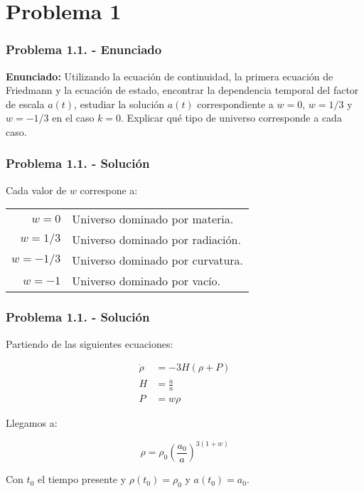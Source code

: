 \section{Problema 1}

\begin{frame}
    \frametitle{Problema 1.1. - Enunciado}

    \textbf{Enunciado:} Utilizando la ecuación de continuidad, la primera ecuación de Friedmann y la ecuación de estado, encontrar la dependencia temporal del factor de escala $a(t)$, estudiar la solución $a(t)$ correspondiente a $w=0$, $w=1/3$ y $w=-1/3$ en el caso $k=0$. Explicar qué tipo de universo corresponde a cada caso.

\end{frame}

\begin{frame}
    \frametitle{Problema 1.1. - Solución}

    Cada valor de $w$ correspone a:

    \begin{table}
        \centering
        \begin{tabular}{rl}
            $w=0$ & Universo dominado por materia.\\
            $w=1/3$ & Universo dominado por radiación.\\
            $w=-1/3$ & Universo dominado por curvatura.\\
            $w=-1$ & Universo dominado por vacío.
        \end{tabular}
    \end{table}

\end{frame}

\begin{frame}
    \frametitle{Problema 1.1. - Solución}

    Partiendo de las siguientes ecuaciones:

    \begin{align}
        \dot{\rho} &= -3H\left(\rho+P\right)\\
        H & = \frac{\dot{a}}{a}\\
        P&=w\rho\label{eq:P}
    \end{align}

    Llegamos a:

    \begin{equation}
        \rho = \rho_0\left(\frac{a_0}{a}\right)^{3\left(1+w\right)} 
        \label{eq:rho(a)}
    \end{equation}

    Con $t_0$ el tiempo presente y $\rho(t_0)=\rho_0$ y $a(t_0)=a_0$.

\end{frame}

